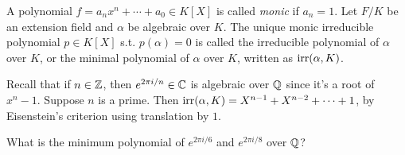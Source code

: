 \begin{definition}
  A polynomial $f=a_nx^n+\cdots+a_0\in K[X]$ is called \emph{monic} if $a_n=1$.
  Let $F/K$ be an extension field and $\alpha$ be algebraic over $K$. The unique monic
  irreducible polynomial $p\in K[X]$ s.t. $p(\alpha)=0$ is called the irreducible
  polynomial of $\alpha$ over $K$, or the minimal polynomial of $\alpha$ over $K$, written
  as $\operatorname{irr} (\alpha, K)$.
\end{definition}

\begin{example}
  Recall that if $n\in\mathbb Z$, then $e^{2\pi i/n}\in\mathbb C$ is algebraic over $\mathbb Q$ since it's a
  root of $x^n-1$. Suppose $n$ is a prime. Then $\operatorname{irr} (\alpha, K)=
  X^{n-1}+X^{n-2}+\cdots+1$, by Eisenstein's criterion using translation by $1$.
\end{example}

\begin{exercise}
  What is the minimum polynomial of $e^{2\pi i /6}$ and $e^{2\pi i /8}$ over $\mathbb Q$?
\end{exercise}

